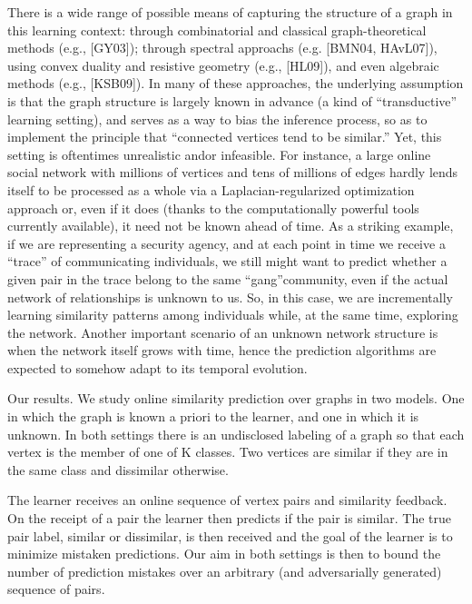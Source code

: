 \documentclass[10pt]{article}
\begin{document}
\begin{multicols}{2}
There is a wide range of possible means of capturing the structure of a graph in this learning context: through combinatorial and classical graph-theoretical methods (e.g., [GY03]); through spectral approachs (e.g. [BMN04, HAvL07]), using convex duality and resistive geometry (e.g., [HL09]), and even algebraic methods (e.g., [KSB09]). In many of these approaches, the underlying assumption is that the graph structure is largely known in advance (a kind of “transductive” learning setting), and serves as a way to bias the inference process, so as to implement the principle that “connected vertices tend to be similar.” Yet, this setting is oftentimes unrealistic andor infeasible. For instance, a large online social network with millions of vertices and tens of millions of edges hardly lends itself to be processed as a whole via a Laplacian-regularized optimization approach or, even if it does (thanks to the computationally powerful tools currently available), it need not be known ahead of time. As a striking example, if we are representing a security agency, and at each point in time we receive a “trace” of communicating individuals, we still might want to predict whether a given pair in the trace belong to the same “gang”community, even if the actual network of relationships is unknown to us. So, in this case, we are incrementally learning similarity patterns among individuals while, at the same time, exploring the network. Another important scenario of an unknown network structure is when the network itself grows with time, hence the prediction algorithms are expected to somehow adapt to its temporal evolution.

Our results. We study online similarity prediction over graphs in two models. One in which the graph is known a priori to the learner, and one in which it is unknown. In both settings there is an undisclosed labeling of a graph so that each vertex is the member of one of K classes. Two vertices are similar if they are in the same class and dissimilar otherwise.

The learner receives an online sequence of vertex pairs and similarity feedback. On the receipt of a pair the learner then predicts if the pair is similar. The true pair label, similar or dissimilar, is then received and the goal of the learner is to minimize mistaken predictions. Our aim in both settings is then to bound the number of prediction mistakes over an arbitrary (and adversarially generated) sequence of pairs.


\end{multicols}
\end{document}
